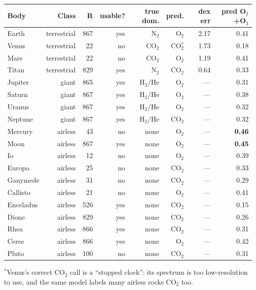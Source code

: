 \documentclass[11pt]{article}
\begin{document}
\begin{center}
\small
\begin{tabular}{lrrrrrrr}
\toprule
Body & Class & R & usable? & true dom. & pred. & dex err & pred O$_2$+O$_3$ \\
\midrule
Earth     & terrestrial & 867 & yes & N$_2$ & O$_2$ & 2.17 & 0.41 \\
Venus     & terrestrial & 22  & no  & CO$_2$& CO$_2^{*}$ & 1.73 & 0.18 \\
Mars      & terrestrial & 22  & no  & CO$_2$& O$_2$ & 1.19 & 0.41 \\
Titan     & terrestrial & 829 & yes & N$_2$ & CO$_2$& 0.64 & 0.33 \\
Jupiter   & giant       & 865 & yes & H$_2$/He & O$_2$ & --- & 0.31 \\
Saturn    & giant       & 867 & yes & H$_2$/He & O$_2$ & --- & 0.38 \\
Uranus    & giant       & 867 & yes & H$_2$/He & O$_2$ & --- & 0.32 \\
Neptune   & giant       & 867 & yes & H$_2$/He & CO$_2$& --- & 0.32 \\
Mercury   & airless     & 43  & no  & none  & O$_2$ & --- & \textbf{0.46} \\
Moon      & airless     & 867 & yes & none  & O$_2$ & --- & \textbf{0.45} \\
Io        & airless     & 12  & no  & none  & O$_2$ & --- & 0.39 \\
Europa    & airless     & 25  & no  & none  & CO$_2$& --- & 0.33 \\
Ganymede  & airless     & 31  & no  & none  & CO$_2$& --- & 0.29 \\
Callisto  & airless     & 21  & no  & none  & O$_2$ & --- & 0.41 \\
Enceladus & airless     & 526 & yes & none  & CO$_2$& --- & 0.15 \\
Dione     & airless     & 829 & yes & none  & CO$_2$& --- & 0.26 \\
Rhea      & airless     & 866 & yes & none  & CO$_2$& --- & 0.31 \\
Ceres     & airless     & 866 & yes & none  & O$_2$ & --- & 0.42 \\
Pluto     & airless     & 100 & no  & none  & CO$_2$& --- & 0.31 \\
\bottomrule
\end{tabular}
\end{center}

\noindent$^{*}$Venus's correct CO$_2$ call is a ``stopped clock'': its spectrum is too
low-resolution to use, and the same model labels many airless rocks CO$_2$ too.
\end{document}

